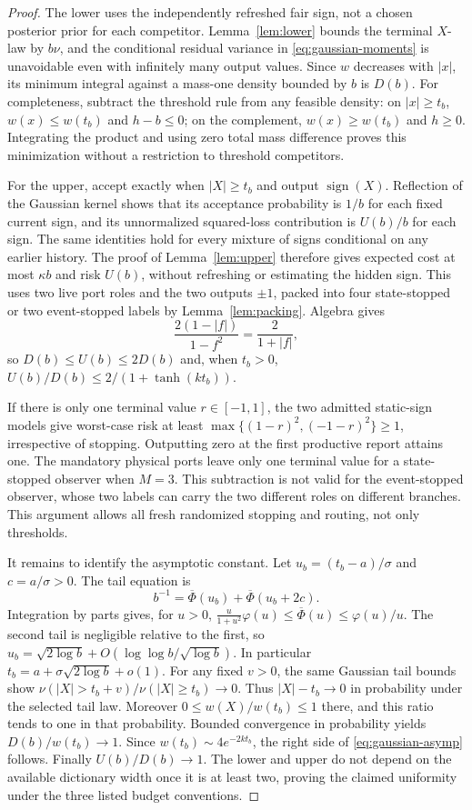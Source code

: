 \begin{proof}
The lower uses the independently refreshed fair sign, not a chosen posterior prior for each competitor. Lemma~\ref{lem:lower} bounds the terminal $X$-law by $b\nu$, and the conditional residual variance in \eqref{eq:gaussian-moments} is unavoidable even with infinitely many output values. Since $w$ decreases with $|x|$, its minimum integral against a mass-one density bounded by $b$ is $D(b)$. For completeness, subtract the threshold rule from any feasible density: on $|x|\ge t_b$, $w(x)\le w(t_b)$ and $h-b\le0$; on the complement, $w(x)\ge w(t_b)$ and $h\ge0$. Integrating the product and using zero total mass difference proves this minimization without a restriction to threshold competitors.

For the upper, accept exactly when $|X|\ge t_b$ and output $\operatorname{sign}(X)$. Reflection of the Gaussian kernel shows that its acceptance probability is $1/b$ for each fixed current sign, and its unnormalized squared-loss contribution is $U(b)/b$ for each sign. The same identities hold for every mixture of signs conditional on any earlier history. The proof of Lemma~\ref{lem:upper} therefore gives expected cost at most $\kappa b$ and risk $U(b)$, without refreshing or estimating the hidden sign. This uses two live port roles and the two outputs $\pm1$, packed into four state-stopped or two event-stopped labels by Lemma~\ref{lem:packing}. Algebra gives
\[
 \frac{2(1-|f|)}{1-f^2}=\frac2{1+|f|},
\]
so $D(b)\le U(b)\le2D(b)$ and, when $t_b>0$,
$U(b)/D(b)\le2/(1+\tanh(kt_b))$.

If there is only one terminal value $r\in[-1,1]$, the two admitted static-sign models give worst-case risk at least
$\max\{(1-r)^2,(-1-r)^2\}\ge1$, irrespective of stopping. Outputting zero at the first productive report attains one. The mandatory physical ports leave only one terminal value for a state-stopped observer when $M=3$. This subtraction is not valid for the event-stopped observer, whose two labels can carry the two different roles on different branches. This argument allows all fresh randomized stopping and routing, not only thresholds.

It remains to identify the asymptotic constant. Let $u_b=(t_b-a)/\sigma$ and $c=a/\sigma>0$. The tail equation is
\[
 b^{-1}=\overline\Phi(u_b)+\overline\Phi(u_b+2c).
\]
Integration by parts gives, for $u>0$,
$\frac{u}{1+u^2}\varphi(u)\le\overline\Phi(u)\le\varphi(u)/u$.
The second tail is negligible relative to the first, so
$u_b=\sqrt{2\log b}+O(\log\log b/\sqrt{\log b})$.
In particular $t_b=a+\sigma\sqrt{2\log b}+o(1)$. For any fixed $v>0$, the same Gaussian tail bounds show
$\nu(|X|>t_b+v)/\nu(|X|\ge t_b)\to0$. Thus $|X|-t_b\to0$ in probability under the selected tail law. Moreover
$0\le w(X)/w(t_b)\le1$ there, and this ratio tends to one in that probability. Bounded convergence in probability yields $D(b)/w(t_b)\to1$. Since $w(t_b)\sim4e^{-2kt_b}$, the right side of \eqref{eq:gaussian-asymp} follows. Finally $U(b)/D(b)\to1$. The lower and upper do not depend on the available dictionary width once it is at least two, proving the claimed uniformity under the three listed budget conventions.
\end{proof}

